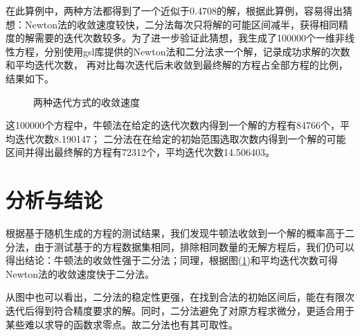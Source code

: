 \documentclass{article}
\begin{document}
     在此算例中，两种方法都得到了一个近似于0.4708的解，根据此算例，容易得出猜想：Newton法的收敛速度较快，二分法每次只将解的可能区间减半，获得相同精度的解需要的迭代次数较多。为了进一步验证此猜想，我生成了100000个一维非线性方程，分别使用gsl库提供的Newton法和二分法求一个解\cite{GSL_roots}，记录成功求解的次数和平均迭代次数，
     再对比每次迭代后未收敛到最终解的方程占全部方程的比例，结果如下。

     \begin{figure}[H]
          \begin{center}
               
          \end{center}
          \caption{两种迭代方式的收敛速度}
          \label{fig::1}
     \end{figure}
     
     这100000个方程中，牛顿法在给定的迭代次数内得到一个解的方程有84766个，平均迭代次数8.190147；
     二分法在在给定的初始范围选取次数内得到一个解的可能区间并得出最终解的方程有72312个，平均迭代次数14.506403。
\section{分析与结论}
     根据基于随机生成的方程的测试结果，我们发现牛顿法收敛到一个解的概率高于二分法，由于测试基于的方程数据集相同，排除相同数量的无解方程后，我们仍可以得出结论：牛顿法的收敛性强于二分法；同理，根据图(\ref{fig::1})和平均迭代次数可得Newton法的收敛速度快于二分法。
     
     从图中也可以看出，二分法的稳定性更强，在找到合法的初始区间后，能在有限次迭代后得到符合精度要求的解。同时，二分法避免了对原方程求微分，更适合用于某些难以求导的函数求零点。故二分法也有其可取性。
     

\end{document}
